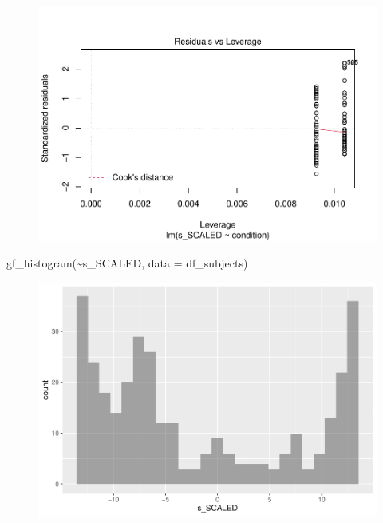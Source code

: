 \documentclass[
  letterpaper,
  DIV=11,
  numbers=noendperiod]{scrreprt}
\newenvironment{Shaded}{\begin{snugshade}}{\end{snugshade}}
\newcommand{\AttributeTok}[1]{\textcolor[rgb]{0.40,0.45,0.13}{#1}}
\newcommand{\FunctionTok}[1]{\textcolor[rgb]{0.28,0.35,0.67}{#1}}
\newcommand{\NormalTok}[1]{\textcolor[rgb]{0.00,0.23,0.31}{#1}}
\newcommand{\SpecialCharTok}[1]{\textcolor[rgb]{0.37,0.37,0.37}{#1}}
\begin{document}
\begin{figure}[H]

{\centering \includegraphics{analysis/SGC3A/5_sgc3A_exploration_files/figure-pdf/unnamed-chunk-9-4.pdf}

}

\end{figure}

\begin{Shaded}
\begin{Highlighting}[]
\FunctionTok{gf\_histogram}\NormalTok{(}\SpecialCharTok{\textasciitilde{}}\NormalTok{s\_SCALED, }\AttributeTok{data =}\NormalTok{ df\_subjects)}
\end{Highlighting}
\end{Shaded}

\begin{figure}[H]

{\centering \includegraphics{analysis/SGC3A/5_sgc3A_exploration_files/figure-pdf/unnamed-chunk-9-5.pdf}

}

\end{figure}
\end{document}

